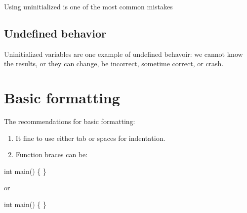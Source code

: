 \documentclass[
  letterpaper,
  DIV=11,
  numbers=noendperiod]{scrreprt}
\newenvironment{Shaded}{\begin{snugshade}}{\end{snugshade}}
\newcommand{\FunctionTok}[1]{\textcolor[rgb]{0.28,0.35,0.67}{#1}}
\newcommand{\NormalTok}[1]{\textcolor[rgb]{0.00,0.23,0.31}{#1}}
\providecommand{\tightlist}{%
  \setlength{\itemsep}{0pt}\setlength{\parskip}{0pt}}\usepackage{longtable,booktabs,array}
\begin{document}
\begin{tcolorbox}[enhanced jigsaw, toprule=.15mm, rightrule=.15mm, opacityback=0, breakable, leftrule=.75mm, colback=white, colframe=quarto-callout-warning-color-frame, arc=.35mm, left=2mm, bottomrule=.15mm]
\begin{minipage}[t]{5.5mm}
\textcolor{quarto-callout-warning-color}{\faExclamationTriangle}
\end{minipage}%
\begin{minipage}[t]{\textwidth - 5.5mm}

Using uninitialized is one of the most common mistakes

\end{minipage}%
\end{tcolorbox}

\hypertarget{undefined-behavior}{%
\subsection{Undefined behavior}\label{undefined-behavior}}

Uninitialized variables are one example of undefined behavoir: we cannot
know the results, or they can change, be incorrect, sometime correct, or
crash.

\hypertarget{basic-formatting}{%
\section{Basic formatting}\label{basic-formatting}}

The recommendations for basic formatting:

\begin{enumerate}
\def\labelenumi{\arabic{enumi}.}
\tightlist
\item
  It fine to use either tab or spaces for indentation.
\item
  Function braces can be:
\end{enumerate}

\begin{Shaded}
\begin{Highlighting}[]
\NormalTok{int }\FunctionTok{main}\NormalTok{() \{}
\NormalTok{\}}
\end{Highlighting}
\end{Shaded}

or

\begin{Shaded}
\begin{Highlighting}[]
\NormalTok{int }\FunctionTok{main}\NormalTok{() }
\NormalTok{\{}
\NormalTok{\}}
\end{Highlighting}
\end{Shaded}
\end{document}
